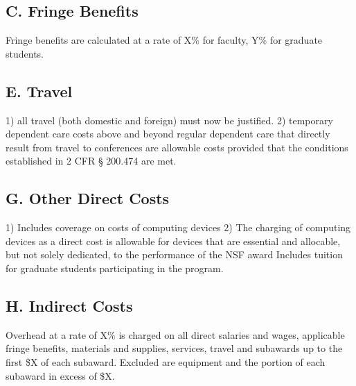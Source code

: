 
\subsection*{C. Fringe Benefits}
Fringe benefits are calculated at a rate of X\% for faculty, Y\% for graduate students.
\subsection*{E. Travel}
1) all travel (both domestic and foreign) must now be justified.
2) temporary dependent care costs above and beyond regular dependent care that directly result from travel to conferences are allowable costs provided that the conditions established in 2 CFR § 200.474 are met.
\subsection*{G. Other Direct Costs}
1) Includes coverage on costs of computing devices
2) The charging of computing devices as a direct cost is allowable for devices that are essential and allocable, but not solely dedicated, to the performance of the NSF award
 Includes tuition for graduate students participating in the program.
\subsection*{H. Indirect Costs}
Overhead at a rate of X\% is charged on all direct salaries and wages, applicable fringe benefits, materials and supplies, services, travel and subawards up to the first \$X of each subaward. Excluded are equipment and the portion of each subaward in excess of \$X.
\fi
